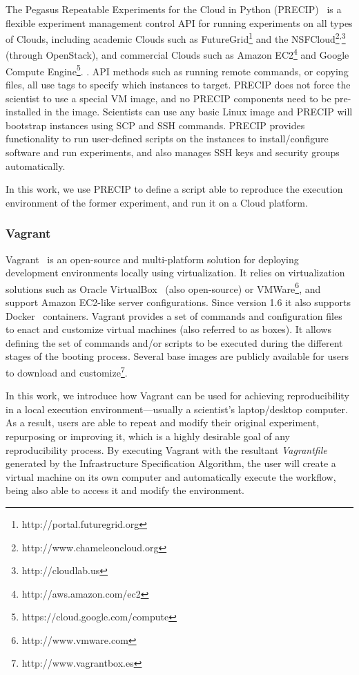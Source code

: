 The Pegasus Repeatable Experiments for the Cloud in Python 
(PRECIP)~\cite{Azarnoosh-CRC-2013} is a flexible experiment 
management control API for running experiments on all types of 
Clouds, including academic Clouds such as FutureGrid\footnote{http://portal.futuregrid.org} 
and the NSFCloud\footnote{http://www.chameleoncloud.org}\textsuperscript{,}\footnote{http://cloudlab.us}
(through OpenStack), and commercial Clouds such as Amazon 
EC2\footnote{http://aws.amazon.com/ec2} and Google Compute 
Engine\footnote{https://cloud.google.com/compute}. . API methods such as running remote commands, 
or copying files, all use tags to specify which instances to target. 
PRECIP does not force the scientist to use a special VM image, 
and no PRECIP components need to be pre-installed in the image. 
Scientists can use any basic Linux image and PRECIP will bootstrap 
instances using SCP and SSH commands. PRECIP provides 
functionality to run user-defined scripts on the instances to install/configure 
software and run experiments, and also manages SSH keys and 
security groups automatically.

In this work, we use PRECIP to define a script able to reproduce 
the execution environment of the former experiment, and run it on 
a Cloud platform.


\subsubsection{Vagrant}

Vagrant~\cite{palat2012introducing} is an open-source and multi-platform solution for deploying 
development environments locally using virtualization. It relies on virtualization solutions such as 
Oracle VirtualBox~\cite{Watson2008} (also open-source) or  VMWare\footnote{http://www.vmware.com}, and support 
Amazon EC2-like server configurations. Since version 1.6 it also supports Docker~\cite{Merkel2014} 
containers.
Vagrant provides a set of commands and configuration files to enact and customize virtual machines
(also referred to as boxes). It allows defining the set of commands and/or scripts to be executed during 
the different stages of the booting process. Several base images are publicly available for users to 
download and customize\footnote{http://www.vagrantbox.es}. 
 
In this work, we introduce how Vagrant can be used for achieving reproducibility in a local execution
environment---usually a scientist's laptop/desktop computer. As a result, users are able to repeat and 
modify their original experiment, repurposing or improving it, which is a highly desirable goal of any 
reproducibility process. By executing Vagrant with the resultant {\it Vagrantfile} generated by the Infrastructure Specification Algorithm, 
the user will create a virtual machine on its own computer and automatically execute the workflow, 
being also able to access it and modify the environment.





